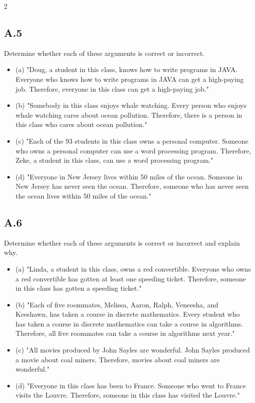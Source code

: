 \documentclass[9pt]{article}
\begin{document}
\begin{multicols}{2}
\subsection*{A.5}
Determine whether each of these arguments is correct or incorrect.
\begin{itemize}
  \item (a) "Doug, a student in this class, knows how to write programs in JAVA. Everyone who knows how to write programs in JAVA can get a high-paying job. Therefore, everyone in this class can get a high-paying job."
  \item (b) "Somebody in this class enjoys whale watching. Every person who enjoys whale watching cares about ocean pollution. Therefore, there is a person in this class who cares about ocean pollution."
  \item (c) "Each of the 93 students in this class owns a personal computer. Someone who owns a personal computer can use a word processing program. Therefore, Zeke, a student in this class, can use a word processing program."
  \item (d) "Everyone in New Jersey lives within 50 miles of the ocean. Someone in New Jersey has never seen the ocean. Therefore, someone who has never seen the ocean lives within 50 miles of the ocean."
\end{itemize}

\subsection*{A.6}
Determine whether each of these arguments is correct or incorrect and explain why.
\begin{itemize}
  \item (a) "Linda, a student in this class, owns a red convertible. Everyone who owns a red convertible has gotten at least one speeding ticket. Therefore, someone in this class has gotten a speeding ticket."
  \item (b) "Each of five roommates, Melissa, Aaron, Ralph, Veneesha, and Keeshawn, has taken a course in discrete mathematics. Every student who has taken a course in discrete mathematics can take a course in algorithms. Therefore, all five roommates can take a course in algorithms next year."
  \item (c) "All movies produced by John Sayles are wonderful. John Sayles produced a movie about coal miners. Therefore, movies about coal miners are wonderful."
  \item (d) "Everyone in this class has been to France. Someone who went to France visits the Louvre. Therefore, someone in this class has visited the Louvre."
\end{itemize}


\end{multicols}
\end{document}
